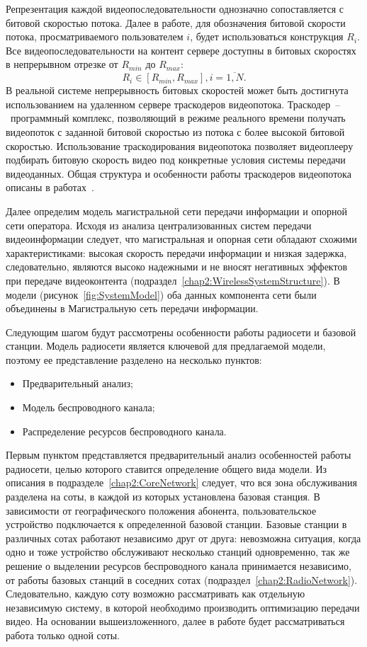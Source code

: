 Репрезентация каждой видеопоследовательности однозначно сопоставляется с битовой скоростью потока. Далее в работе, для обозначения битовой скорости потока, просматриваемого пользователем $i$, будет использоваться конструкция $R_i$. Все видеопоследовательности на контент сервере доступны в битовых скоростях в непрерывном отрезке от $R_{min}$ до $R_{max}$:
\begin{equation}
\nonumber
R_i \in [R_{min}, R_{max}], i=\overline{1,N}.
\label{eq:BitrateConstr}
\end{equation}
В реальной системе непрерывность битовых скоростей может быть достигнута использованием на удаленном сервере траскодеров видеопотока. Траскодер~--~программный комплекс, позволяющий в режиме реального времени получать видеопоток с заданной битовой скоростью из потока с более высокой битовой скоростью. Использование траскодирования видеопотока позволяет видеоплееру подбирать битовую скорость видео под конкретные условия системы передачи видеоданных. Общая структура и особенности работы траскодеров видеопотока описаны в работах~\cite{1184336,1369700}.

Далее определим модель магистральной сети передачи информации и опорной сети оператора. Исходя из анализа централизованных систем передачи видеоинформации следует, что магистральная и опорная сети обладают схожими характеристиками: высокая скорость передачи информации и низкая задержка, следовательно, являются высоко надежными и не вносят негативных эффектов при передаче видеоконтента (подраздел~\ref{chap2:WirelessSystemStructure}). В модели (рисунок~\ref{fig:SystemModel}) оба данных компонента сети были объединены в Магистральную сеть передачи информации.

Следующим шагом будут рассмотрены особенности работы радиосети и базовой станции. Модель радиосети является ключевой для предлагаемой модели, поэтому ее представление разделено на несколько пунктов:
\begin{itemize}
  \item Предварительный анализ;
  \item Модель беспроводного канала;
  \item Распределение ресурсов беспроводного канала.
\end{itemize}

Первым пунктом представляется предварительный анализ особенностей работы радиосети, целью которого ставится определение общего вида модели. Из описания в подразделе~\ref{chap2:CoreNetwork} следует, что вся зона обслуживания разделена на соты, в каждой из которых установлена базовая станция. В зависимости от географического положения абонента, пользовательское устройство подключается к определенной базовой станции. Базовые станции в различных сотах работают независимо друг от друга: невозможна ситуация, когда одно и тоже устройство обслуживают несколько станций одновременно, так же решение о выделении ресурсов беспроводного канала принимается независимо, от работы базовых станций в соседних сотах (подраздел~\ref{chap2:RadioNetwork}). Следовательно, каждую соту возможно рассматривать как отдельную независимую систему, в которой необходимо производить оптимизацию передачи видео. На основании вышеизложенного, далее в работе будет рассматриваться работа только одной соты.

